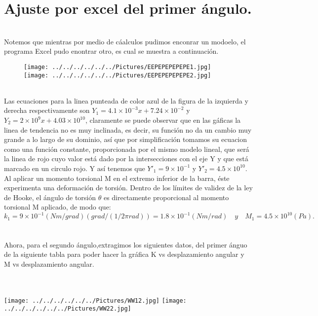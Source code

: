 \documentclass[10pt,a4paper]{article}
\begin{document}
\section*{Ajuste por excel del primer \'{a}ngulo.}\\
Notemos que mientras por medio de c\'{a}alculos pudimos enconrar un modoelo, el programa Excel pudo enontrar otro, es cual se muestra a continuaci\'{o}n.
\\
\begin{figure}[hbtp]
 \centering
\texttt{[image: ../../../../../../Pictures/EEPEPEPEPEPE1.jpg]} 
\texttt{[image: ../../../../../../Pictures/EEPEPEPEPEPE2.jpg]}  
\end{figure}
\\
Las ecuaciones para la linea punteada de color azul de la figura de la izquierda y derecha respectivamente son ${ Y }_{ 1 }= { 4.1\times 10 }^{ -3 }x + 7.24\times { 10 }^{ -2 }$ y ${ Y }_{ 2 }= { 2\times 10 }^{ 9 }x + { 4.03\times  10 }^{ 10 }$, claramente se puede observar que en las g\'{a}ficas la linea de tendencia no es muy inclinada, es decir, su funci\'{o}n no da un cambio muy grande a lo largo de su dominio, as\'{i} que por simplificaci\'{o}n tomamos su ecuacion como una funci\'{o}n constante, proporcionada por el mismo modelo lineal, que ser\'{a} la linea de rojo cuyo valor est\'{a} dado por la intersecciones con el eje Y y que est\'{a} marcado en un circulo rojo. Y as\'{i} tenemos que ${ Y }'_{ 1 }= 9\times{10}^{-1}$ y ${ Y }'_{ 2 }=4.5\times { 10 }^{ 10 }$. Al aplicar un momento torsional M en el extremo inferior de la barra, \'{e}ste experimenta una deformaci\'{o}n de torsi\'{o}n. Dentro de los l\'{i}mites de validez de la ley de Hooke, el \'{a}ngulo de torsi\'{o}n $\theta$ es directamente proporcional al momento torsional M aplicado, de modo que:
\[{ k }_{ 1 }= 9\times{10}^{-1} (Nm/grad)\left( { grad }/{ \left( { 1 }/{ 2\pi rad } \right)  } \right)=1.8\times{10}^{-1}(Nm/rad)\quad y \quad { M }_{ 1 }=4.5\times { 10 }^{ 10 } (Pa).\]
\\
\\
Ahora, para el segundo \'{a}ngulo,extragimos los siguientes datos, del primer \'{a}nguo de la siguiente tabla para poder hacer la gr\'{a}fica K vs desplazamiento angular y M vs desplazamiento angular.
\\
\\
\begin{figure 8}
\centering
\caption{\textbf{Tabla 3.}  Datos tabulados para graficar.}
\\
\centering
\texttt{[image: ../../../../../../Pictures/WW12.jpg]} 
\texttt{[image: ../../../../../../Pictures/WW22.jpg]}
\end{figure 8}
\\
\end{document}
